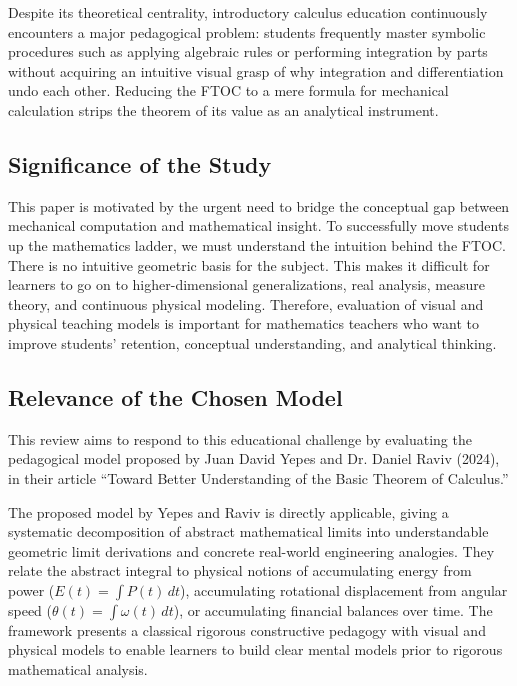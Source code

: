 \documentclass[11pt, a4paper]{article}
\begin{document}
Despite its theoretical centrality, introductory calculus education continuously encounters a major pedagogical problem: students frequently master symbolic procedures such as applying algebraic rules or performing integration by parts without acquiring an intuitive visual grasp of why integration and differentiation undo each other. Reducing the FTOC to a mere formula for mechanical calculation strips the theorem of its value as an analytical instrument.

\subsection{Significance of the Study}
\label{subsec:significance}
This paper is motivated by the urgent need to bridge the conceptual gap between mechanical computation and mathematical insight. To successfully move students up the mathematics ladder, we must understand the intuition behind the FTOC. There is no intuitive geometric basis for the subject. This makes it difficult for learners to go on to higher-dimensional generalizations, real analysis, measure theory, and continuous physical modeling. Therefore, evaluation of visual and physical teaching models is important for mathematics teachers who want to improve students' retention, conceptual understanding, and analytical thinking.

\subsection{Relevance of the Chosen Model}
This review aims to respond to this educational challenge by evaluating the pedagogical model proposed by Juan David Yepes and Dr. Daniel Raviv (2024), in their article ``Toward Better Understanding of the Basic Theorem of Calculus.''

The proposed model by Yepes and Raviv \cite{Yepes2024} is directly applicable, giving a systematic decomposition of abstract mathematical limits into understandable geometric limit derivations and concrete real-world engineering analogies. They relate the abstract integral to physical notions of accumulating energy from power ($E(t) = \int P(t) \, dt$), accumulating rotational displacement from angular speed ($\theta(t) = \int \omega(t) \, dt$), or accumulating financial balances over time. The framework presents a classical rigorous constructive pedagogy with visual and physical models to enable learners to build clear mental models prior to rigorous mathematical analysis.
\end{document}
